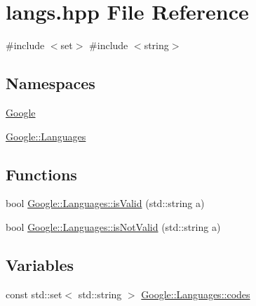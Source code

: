 \hypertarget{a00017}{}\section{langs.\+hpp File Reference}
\label{a00017}
{\ttfamily \#include $<$set$>$}\newline
{\ttfamily \#include $<$string$>$}\newline
\subsection*{Namespaces}
\begin{DoxyCompactItemize}
\item 
 \hyperlink{a00032}{Google}
\item 
 \hyperlink{a00036}{Google\+::\+Languages}
\end{DoxyCompactItemize}
\subsection*{Functions}
\begin{DoxyCompactItemize}
\item 
bool \hyperlink{a00036_a865e8f79f8de870b2e6eb5cf40b0fac9}{Google\+::\+Languages\+::is\+Valid} (std\+::string a)
\item 
bool \hyperlink{a00036_a0ed7c663d00601bb86dd56e55a5304a8}{Google\+::\+Languages\+::is\+Not\+Valid} (std\+::string a)
\end{DoxyCompactItemize}
\subsection*{Variables}
\begin{DoxyCompactItemize}
\item 
const std\+::set$<$ std\+::string $>$ \hyperlink{a00036_a7323c7ef1fa5d84f505aa504095b788a}{Google\+::\+Languages\+::codes}
\end{DoxyCompactItemize}
